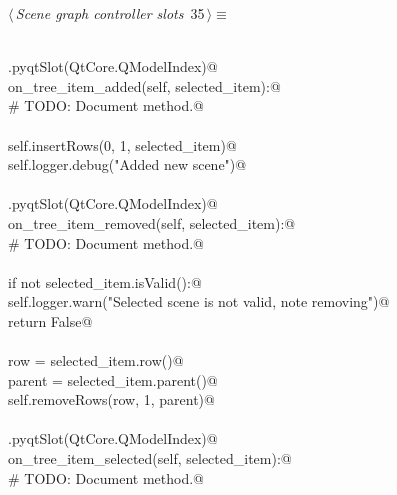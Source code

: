 \documentclass[
    a4paper,      %
    10pt,         %
    openright,    %
    notitlepage,  %
    parskip=half, %
]{scrreprt}       %
\theoremstyle{definition}                    %
\begin{document}
\begin{flushleft} \small
\begin{minipage}{\linewidth}\label{scrap41}\raggedright\small
{} $\langle\,${\itshape Scene graph controller slots}\nobreak\ {\footnotesize {35}}$\,\rangle\equiv$
\vspace{-1exm}
\begin{list}{}{} \item
\mbox{}\lstinline@@\\
\mbox{}\lstinline@QtCore.pyqtSlot(QtCore.QModelIndex)@\\
\mbox{}\lstinline@def on_tree_item_added(self, selected_item):@\\
\mbox{}\lstinline@    # TODO: Document method.@\\
\mbox{}\lstinline@@\\
\mbox{}\lstinline@    self.insertRows(0, 1, selected_item)@\\
\mbox{}\lstinline@    self.logger.debug("Added new scene")@\\
\mbox{}\lstinline@@\\
\mbox{}\lstinline@QtCore.pyqtSlot(QtCore.QModelIndex)@\\
\mbox{}\lstinline@def on_tree_item_removed(self, selected_item):@\\
\mbox{}\lstinline@    # TODO: Document method.@\\
\mbox{}\lstinline@@\\
\mbox{}\lstinline@    if not selected_item.isValid():@\\
\mbox{}\lstinline@        self.logger.warn("Selected scene is not valid, note removing")@\\
\mbox{}\lstinline@        return False@\\
\mbox{}\lstinline@@\\
\mbox{}\lstinline@    row = selected_item.row()@\\
\mbox{}\lstinline@    parent = selected_item.parent()@\\
\mbox{}\lstinline@    self.removeRows(row, 1, parent)@\\
\mbox{}\lstinline@@\\
\mbox{}\lstinline@QtCore.pyqtSlot(QtCore.QModelIndex)@\\
\mbox{}\lstinline@def on_tree_item_selected(self, selected_item):@\\
\mbox{}\lstinline@    # TODO: Document method.@\\

\end{list}
\end{minipage}
\end{flushleft}
\end{document}
